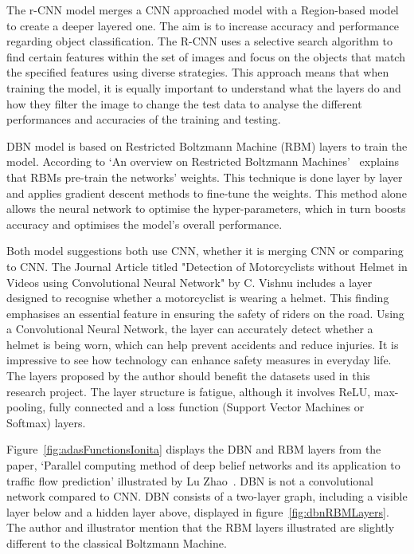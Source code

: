 \documentclass[12pt]{report} %
\begin{document}
		The r-CNN model merges a CNN approached model with a Region-based model to create a deeper layered one. The aim is to increase accuracy and performance regarding object classification. The R-CNN uses a selective search algorithm to find certain features within the set of images and focus on the objects that match the specified features using diverse strategies. This approach means that when training the model, it is equally important to understand what the layers do and how they filter the image to change the test data to analyse the different performances and accuracies of the training and testing.~\cite{uijlings_selective_2013}~\cite{ren_faster_2015}

		DBN model is based on Restricted Boltzmann Machine (RBM) layers to train the model. According to `An overview on Restricted Boltzmann Machines'~\cite{zhang_overview_2018} explains that RBMs pre-train the networks' weights. This technique is done layer by layer and applies gradient descent methods to fine-tune the weights. This method alone allows the neural network to optimise the hyper-parameters, which in turn boosts accuracy and optimises the model's overall performance.

		Both model suggestions both use CNN, whether it is merging CNN or comparing to CNN. The Journal Article titled "Detection of Motorcyclists without Helmet in Videos using Convolutional Neural Network" by C. Vishnu includes a layer designed to recognise whether a motorcyclist is wearing a helmet. This finding emphasises an essential feature in ensuring the safety of riders on the road. Using a Convolutional Neural Network, the layer can accurately detect whether a helmet is being worn, which can help prevent accidents and reduce injuries. It is impressive to see how technology can enhance safety measures in everyday life. The layers proposed by the author should benefit the datasets used in this research project. The layer structure is fatigue, although it involves ReLU, max-pooling, fully connected and a loss function (Support Vector Machines or Softmax) layers.
        
        Figure~\ref{fig:adasFunctionsIonita} displays the DBN and RBM layers from the paper, `Parallel computing method of deep belief networks and its application to traffic flow prediction' illustrated by Lu Zhao~\cite{zhao_parallel_2019}. DBN is not a convolutional network compared to CNN. DBN consists of a two-layer graph, including a visible layer below and a hidden layer above, displayed in figure~\ref{fig:dbnRBMLayers}. The author and illustrator mention that the RBM layers illustrated are slightly different to the classical Boltzmann Machine.~\cite{zhao_parallel_2019}
\end{document}
